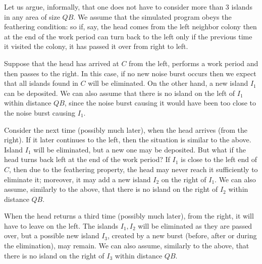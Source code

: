 \documentclass[12pt]{memoir}
\def\B{B}
\begin{document}
Let us argue, informally, that one does 
not have to consider more than 3 islands in any area of size \( Q\B \).
We assume that the simulated program obeys the
feathering condition: so if, say, the head comes from the left neighbor colony
then at the end of the work period can turn back to the left only if 
the previous time it visited the colony, it has passed it over from right to left.

\begin{example}[3 islands]\label{xmp:3-islands}
  Suppose that the head has arrived at \( C \) from the left,
performs a work period and then passes to the right.
In this case, if no new noise burst occurs then we expect that
all islands found in \( C \) will be eliminated.
On the other hand, a new island \( I_{1} \) can be deposited.
We can also assume that there is no island on the left of  \( I_{1} \) 
within distance \( Q\B \), since the noise burst
causing it would have been too close to the noise burst causing \( I_{1} \).

Consider the next time (possibly much later), when the head arrives (from the right).
If it later continues to the left, then the situation is similar to the above.
Island \( I_{1} \) will be eliminated, but a new one may be deposited.
But what if the head turns back left at the end of the work period?
If \( I_{1} \) is close to the left end of \( C \), then due to the feathering
property, the head may never reach it sufficiently to eliminate it; moreover,
it may add a new island \( I_{2} \) on the right of \( I_{1} \).
We can also assume, similarly to the above, 
that there is no island on the right of  \( I_{2} \) within distance \( Q\B \).

When the head returns a third time (possibly much later), 
from the right, it will have to leave on the left.
The islands \( I_{1},I_{2} \) will be eliminated as they are passed over, 
but a possible new island
\( I_{3} \), created by a new burst (before, after or during the elimination), may remain.
We can also assume, similarly to the above, 
that there is no island on the right of  \( I_{3} \) within distance \( Q\B \).
\end{example}
\end{document}
